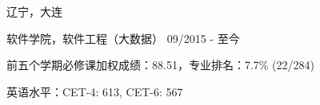 \vspace{-6.0mm}

\begin{cventries}
\vspace{-1.5mm}
\cveducation
{}
{辽宁，大连}

\cvsubeducation
{软件学院，软件工程（大数据）}
{09/2015 - 至今}
{
    \begin{cvitems}
    \item {前五个学期必修课加权成绩：88.51，专业排名：7.7\% (22/284)}
    \item {英语水平：CET-4: 613, CET-6: 567}
    \end{cvitems}
}

\end{cventries}
